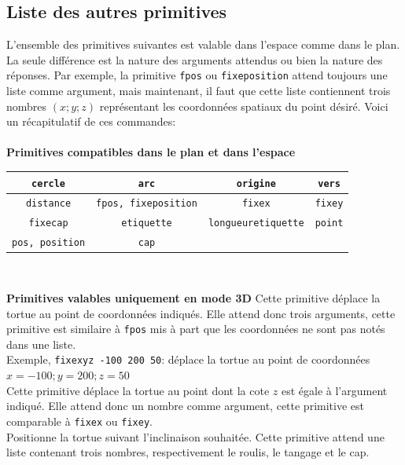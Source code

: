 \subsection{Liste des autres primitives}
L'ensemble des primitives suivantes est valable dans l'espace comme dans le plan. La seule différence est la nature des arguments attendus ou bien la nature des réponses. Par exemple, la primitive \texttt{fpos} ou \texttt{fixeposition} attend toujours une liste comme argument, mais maintenant, il faut que cette liste contiennent trois nombres $(x;y;z)$ représentant les coordonnées spatiaux du point désiré. Voici un récapitulatif de ces commandes:\\ \\
\textbf{
Primitives compatibles dans le plan et dans l'espace} \vspace*{0.5cm}
\begin{center}
\begin{tabular}{|cccc|}
\hline
\texttt{cercle}&
 \texttt{arc}&
\texttt{origine}&
\texttt{vers}\\
 \hline
\texttt{distance}&
 \texttt{fpos, fixeposition}&
\texttt{fixex}&
\texttt{fixey}\\
\hline
\texttt{fixecap}&
\texttt{etiquette}&
\texttt{longueuretiquette}&
\texttt{point}\\
\hline
\texttt{pos, position}&
\texttt{cap} & &\\
\hline
\end{tabular} \\ \vspace{0.5cm}
\end{center}
\textbf{Primitives valables uniquement en mode 3D}\vspace{0.5cm}
Cette primitive déplace la tortue au point de coordonnées indiqués. Elle attend donc trois arguments, cette primitive est similaire à \texttt{fpos} mis à part que les coordonnées ne sont pas notés dans une liste. \\
Exemple, \texttt{fixexyz -100 200 50}: déplace la tortue au point de coordonnées $x=-100;y=200;z=50$\\
Cette primitive déplace la tortue au point dont la cote $z$ est égale à l'argument indiqué. Elle attend donc un nombre comme argument, cette primitive est comparable à \texttt{fixex} ou \texttt{fixey}. \\
Positionne la tortue suivant l'inclinaison souhaitée. Cette primitive attend une liste contenant trois nombres, respectivement le roulis, le tangage et le cap.\\
